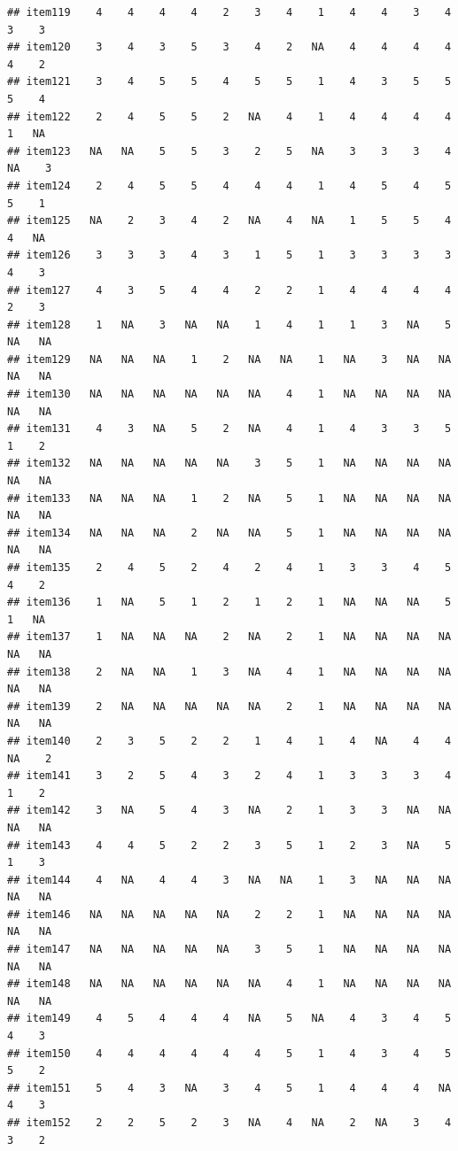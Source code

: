\documentclass[
  man]{apa6}
\begin{document}
\begin{verbatim}
## item119    4    4    4    4    2    3    4    1    4    4    3    4    3    3
## item120    3    4    3    5    3    4    2   NA    4    4    4    4    4    2
## item121    3    4    5    5    4    5    5    1    4    3    5    5    5    4
## item122    2    4    5    5    2   NA    4    1    4    4    4    4    1   NA
## item123   NA   NA    5    5    3    2    5   NA    3    3    3    4   NA    3
## item124    2    4    5    5    4    4    4    1    4    5    4    5    5    1
## item125   NA    2    3    4    2   NA    4   NA    1    5    5    4    4   NA
## item126    3    3    3    4    3    1    5    1    3    3    3    3    4    3
## item127    4    3    5    4    4    2    2    1    4    4    4    4    2    3
## item128    1   NA    3   NA   NA    1    4    1    1    3   NA    5   NA   NA
## item129   NA   NA   NA    1    2   NA   NA    1   NA    3   NA   NA   NA   NA
## item130   NA   NA   NA   NA   NA   NA    4    1   NA   NA   NA   NA   NA   NA
## item131    4    3   NA    5    2   NA    4    1    4    3    3    5    1    2
## item132   NA   NA   NA   NA   NA    3    5    1   NA   NA   NA   NA   NA   NA
## item133   NA   NA   NA    1    2   NA    5    1   NA   NA   NA   NA   NA   NA
## item134   NA   NA   NA    2   NA   NA    5    1   NA   NA   NA   NA   NA   NA
## item135    2    4    5    2    4    2    4    1    3    3    4    5    4    2
## item136    1   NA    5    1    2    1    2    1   NA   NA   NA    5    1   NA
## item137    1   NA   NA   NA    2   NA    2    1   NA   NA   NA   NA   NA   NA
## item138    2   NA   NA    1    3   NA    4    1   NA   NA   NA   NA   NA   NA
## item139    2   NA   NA   NA   NA   NA    2    1   NA   NA   NA   NA   NA   NA
## item140    2    3    5    2    2    1    4    1    4   NA    4    4   NA    2
## item141    3    2    5    4    3    2    4    1    3    3    3    4    1    2
## item142    3   NA    5    4    3   NA    2    1    3    3   NA   NA   NA   NA
## item143    4    4    5    2    2    3    5    1    2    3   NA    5    1    3
## item144    4   NA    4    4    3   NA   NA    1    3   NA   NA   NA   NA   NA
## item146   NA   NA   NA   NA   NA    2    2    1   NA   NA   NA   NA   NA   NA
## item147   NA   NA   NA   NA   NA    3    5    1   NA   NA   NA   NA   NA   NA
## item148   NA   NA   NA   NA   NA   NA    4    1   NA   NA   NA   NA   NA   NA
## item149    4    5    4    4    4   NA    5   NA    4    3    4    5    4    3
## item150    4    4    4    4    4    4    5    1    4    3    4    5    5    2
## item151    5    4    3   NA    3    4    5    1    4    4    4   NA    4    3
## item152    2    2    5    2    3   NA    4   NA    2   NA    3    4    3    2

\end{verbatim}
\end{document}
